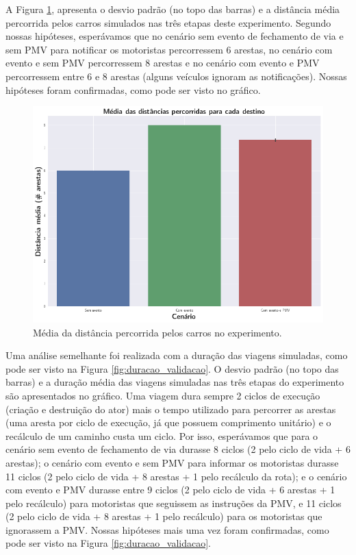 A Figura \ref{fig:distancia_validacao}, apresenta o desvio padrão (no topo das barras) e a distância média percorrida pelos carros simulados nas três etapas deste experimento.
Segundo nossas hipóteses, esperávamos que no cenário sem evento de fechamento de via e sem PMV para notificar os motoristas percorressem 6 arestas, no cenário com evento e sem PMV percorressem 8 arestas
e no cenário com evento e PMV percorressem entre 6 e 8 arestas (alguns veículos ignoram as notificações).
Nossas hipóteses foram confirmadas, como pode ser visto no gráfico.

\begin{figure}[ht]
	\centering
	\includegraphics[width=.8\textwidth]{figuras/distancia_validacao.png}
	\caption{Média da distância percorrida pelos carros no experimento.}
	\label{fig:distancia_validacao}
\end{figure}

Uma análise semelhante foi realizada com a duração das viagens simuladas, como pode ser visto na Figura \ref{fig:duracao_validacao}.
O desvio padrão (no topo das barras) e a duração média das viagens simuladas nas três etapas do experimento são apresentados no gráfico.
Uma viagem dura sempre 2 ciclos de execução (criação e destruição do ator) mais o tempo utilizado para percorrer as arestas (uma aresta por ciclo de execução, já que possuem comprimento unitário)
e o recálculo de um caminho custa um ciclo.
Por isso, esperávamos que para o cenário sem evento de fechamento de via durasse 8 ciclos (2 pelo ciclo de vida + 6 arestas);
o cenário com evento e sem PMV para informar os motoristas durasse 11 ciclos (2 pelo ciclo de vida + 8 arestas + 1 pelo recálculo da rota);
e o cenário com evento e PMV durasse entre 9 ciclos (2 pelo ciclo de vida + 6 arestas + 1 pelo recálculo) para motoristas que seguissem as instruções da PMV, e 11 ciclos (2 pelo ciclo de vida + 8 arestas +
1 pelo recálculo) para os motoristas que ignorassem a PMV.
Nossas hipóteses mais uma vez foram confirmadas, como pode ser visto na Figura \ref{fig:duracao_validacao}.

